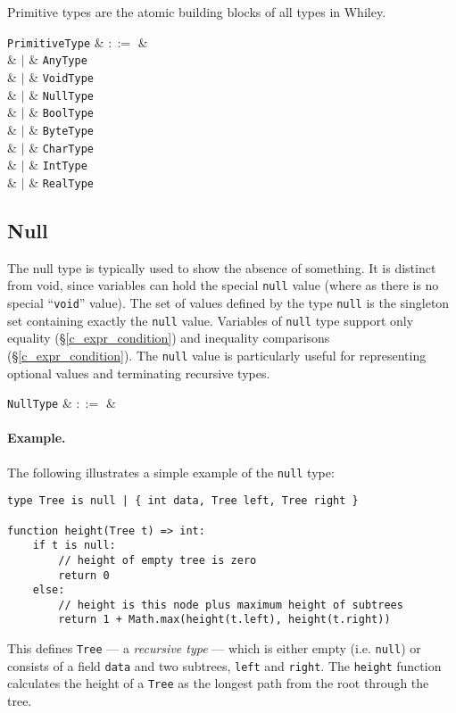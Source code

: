 Primitive types are the atomic building blocks of all types in Whiley.  

\begin{syntax}
  \verb+PrimitiveType+ & $::=$ & \\
  & $|$ & \verb+AnyType+ \\
  & $|$ & \verb+VoidType+ \\
  & $|$ & \verb+NullType+ \\
  & $|$ & \verb+BoolType+ \\
  & $|$ & \verb+ByteType+ \\
  & $|$ & \verb+CharType+ \\
  & $|$ & \verb+IntType+ \\
  & $|$ & \verb+RealType+ \\
\end{syntax}


\subsection{Null}
\label{c_types_null}

The null type is typically used to show the absence of something. It is distinct from void, since variables can hold the special \lstinline{null} value (where as there is no special ``\lstinline{void}'' value).  The set of values defined by the type \lstinline{null} is the singleton set containing exactly the \lstinline{null} value.  Variables of \lstinline{null} type support only equality (\S\ref{c_expr_condition}) and inequality comparisons (\S\ref{c_expr_condition}).  The \lstinline{null} value is particularly useful for representing optional values and terminating recursive types.

\begin{syntax}
  \verb+NullType+ & $::=$ &  \\
\end{syntax}

\paragraph{Example.} The following illustrates a simple example of the \lstinline{null} type:

\begin{lstlisting}
type Tree is null | { int data, Tree left, Tree right }

function height(Tree t) => int:
    if t is null:
        // height of empty tree is zero
        return 0
    else:
        // height is this node plus maximum height of subtrees
        return 1 + Math.max(height(t.left), height(t.right))
\end{lstlisting}
This defines \lstinline{Tree} --- a {\em recursive type} --- which is either empty (i.e. \lstinline{null}) or consists of a field \lstinline{data} and two subtrees, \lstinline{left} and \lstinline{right}.  The \lstinline{height} function calculates the height of a \lstinline{Tree} as the longest path from the root through the tree.

